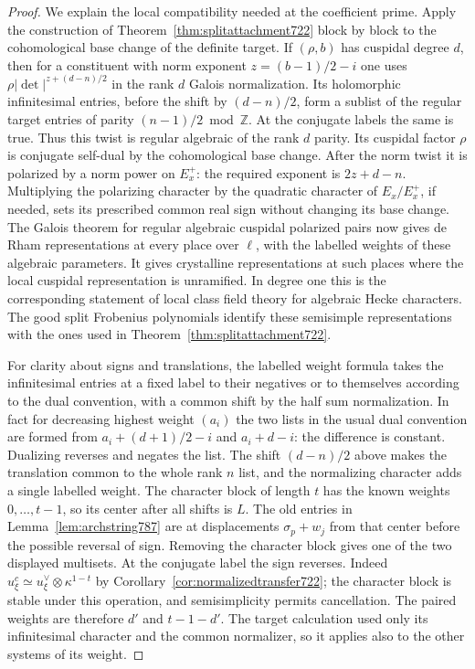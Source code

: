 \documentclass[a4paper,11pt]{article}
\theoremstyle{definition}
\theoremstyle{remark}
\newcommand{\ZZ}{\mathbb Z}\newcommand{\ord}{\operatorname{ord}}
\numberwithin{equation}{section}
\begin{document}
\begin{proof}
We explain the local compatibility needed at the coefficient
prime. Apply the construction of
Theorem~\ref{thm:splitattachment722} block by block to the
cohomological base change of the definite target. If
\((\rho,b)\) has cuspidal degree \(d\), then for a constituent
with norm exponent \(z=(b-1)/2-i\) one uses
\(\rho|\det|^{z+(d-n)/2}\) in the rank \(d\) Galois
normalization. Its holomorphic infinitesimal entries, before
the shift by \((d-n)/2\), form a sublist of the regular
target entries of parity \((n-1)/2\bmod\ZZ\). At the
conjugate labels the same is true. Thus this twist is
regular algebraic of the rank \(d\) parity. Its cuspidal
factor \(\rho\) is conjugate self-dual by the cohomological
base change. After the norm twist it is polarized by
a norm power on \(E_x^+\): the required exponent is
\(2z+d-n\). Multiplying the polarizing character by
the quadratic character of \(E_x/E_x^+\), if needed,
sets its prescribed common real sign without changing
its base change. The Galois theorem for regular algebraic
cuspidal polarized pairs now gives de Rham representations
at every place over \(\ell\), with the labelled weights
of these algebraic parameters. It gives crystalline
representations at such places where the local cuspidal
representation is unramified. In degree one this is
the corresponding statement of local class field theory
for algebraic Hecke characters. The good split
Frobenius polynomials identify these semisimple
representations with the ones used in
Theorem~\ref{thm:splitattachment722}.
\cite[Theorem~2.1.1]{III-II-blggt788}

For clarity about signs and translations, the labelled
weight formula takes the infinitesimal entries at a fixed
label to their negatives or to themselves according to the
dual convention, with a common shift by the half sum
normalization. In fact for decreasing highest weight
\((a_i)\) the two lists in the usual dual convention are
formed from \(a_i+(d+1)/2-i\) and \(a_i+d-i\):
the difference is constant. Dualizing reverses and
negates the list. The shift \((d-n)/2\) above makes the
translation common to the whole rank \(n\) list, and
the normalizing character adds a single labelled weight.
The character block of length \(t\) has the known weights
\(0,\ldots,t-1\), so its center after all shifts is \(L\).
The old entries in Lemma~\ref{lem:archstring787} are
at displacements \(\sigma_p+w_j\) from that center
before the possible reversal of sign. Removing the
character block gives one of the two displayed multisets.
At the conjugate label the sign reverses. Indeed
\(u_\xi^c\simeq u_\xi^\vee\otimes\kappa^{1-t}\) by
Corollary~\ref{cor:normalizedtransfer722}; the
character block is stable under this operation, and
semisimplicity permits cancellation. The paired
weights are therefore \(d'\) and \(t-1-d'\).
The target calculation used only its infinitesimal
character and the common normalizer, so it applies
also to the other systems of its weight.


\end{proof}
\end{document}
